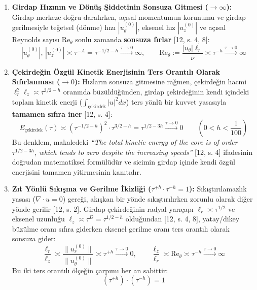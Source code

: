 \documentclass[12pt,a4paper]{article}
\begin{document}
\begin{enumerate}
    \item \textbf{Girdap Hızının ve Dönüş Şiddetinin Sonsuza Gitmesi ($\to \infty$):} Girdap merkeze doğru daralırken, açısal momentumun korunumu ve girdap gerilmesiyle teğetsel (dönme) hızı $|u_\theta^{(0)}|$, eksenel hız $|u_z^{(0)}|$ ve açısal Reynolds sayısı $\text{Re}_\theta$ sonlu zamanda \textbf{sonsuza fırlar} [12, s. 4, 8]:
    \begin{equation}
    |u_\theta^{(0)}|, \, |u_z^{(0)}| \asymp \tau^{-A} = \tau^{-1/2 - h} \xrightarrow{\tau \to 0} \infty, \qquad \text{Re}_\theta := \frac{|u_\theta|\ell_r}{\nu} \asymp \tau^{-h} \xrightarrow{\tau \to 0} \infty
    \end{equation}
    
    \item \textbf{Çekirdeğin Özgül Kinetik Enerjisinin Ters Orantılı Olarak Sıfırlanması ($\to 0$):} Hızların sonsuza gitmesine rağmen, çekirdeğin hacmi $\ell_r^2 \ell_z \asymp \tau^{3/2 - h}$ oranında büzüldüğünden, girdap çekirdeğinin kendi içindeki toplam kinetik enerji ($\int_{\text{çekirdek}} |u|^2 dx$) ters yönlü bir kuvvet yasasıyla \textbf{tamamen sıfıra iner} [12, s. 4]:
    \begin{equation}
    E_{\text{çekirdek}}(\tau) \asymp \left(\tau^{-1/2-h}\right)^2 \cdot \tau^{3/2-h} = \tau^{1/2 - 3h} \xrightarrow{\tau \to 0} 0 \qquad \left(0 < h < \frac{1}{100}\right)
    \end{equation}
    Bu denklem, makaledeki \textit{``The total kinetic energy of the core is of order $\tau^{1/2-3h}$, which tends to zero despite the increasing speeds''} [12, s. 4] ifadesinin doğrudan matematiksel formülüdür ve sicimin girdap içinde kendi özgül enerjisini tamamen yitirmesinin kanıtıdır.

    \item \textbf{Zıt Yönlü Sıkışma ve Gerilme İkizliği ($\tau^{+h} \cdot \tau^{-h} = 1$):} Sıkıştırılamazlık yasası ($\nabla \cdot u = 0$) gereği, akışkan bir yönde sıkıştırılırken zorunlu olarak diğer yönde gerilir [12, s. 2]. Girdap çekirdeğinin radyal yarıçapı $\ell_r \asymp \tau^{1/2}$ ve eksenel uzunluğu $\ell_z \asymp \tau^{D} = \tau^{1/2-h}$ olduğundan [12, s. 4, 8], yatay/dikey büzülme oranı sıfıra giderken eksenel gerilme oranı ters orantılı olarak sonsuza gider:
    \begin{equation}
    \frac{\ell_r}{\ell_z} \asymp \frac{\|u_r^{(0)}\|}{\|u_\theta^{(0)}\|} \asymp \tau^{+h} \xrightarrow{\tau \to 0} 0, \qquad \frac{\ell_z}{\ell_r} \asymp \text{Re}_\theta \asymp \tau^{-h} \xrightarrow{\tau \to 0} \infty
    \end{equation}
    Bu iki ters orantılı ölçeğin çarpımı her an sabittir:
    \begin{equation}
    \left(\tau^{+h}\right) \cdot \left(\tau^{-h}\right) = 1
    \end{equation}


\end{enumerate}
\end{document}
